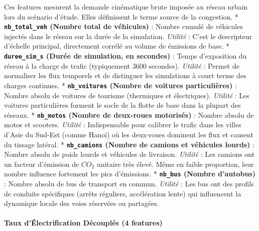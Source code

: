 \documentclass[10pt, a4paper]{article}
\begin{document}
Ces features mesurent la demande cinématique brute imposée au réseau
urbain lors du scénario d'étude. Elles définissent le terme source de la
congestion. * \textbf{\texttt{nb\_total\_veh} (Nombre total de
véhicules)} : Nombre cumulé de véhicules injectés dans le réseau sur la
durée de la simulation. \emph{Utilité} : C'est le descripteur d'échelle
principal, directement corrélé au volume de émissions de base. *
\textbf{\texttt{duree\_sim\_s} (Durée de simulation, en secondes)} :
Temps d'exposition du réseau à la charge de trafic (typiquement 3600
secondes). \emph{Utilité} : Permet de normaliser les flux temporels et
de distinguer les simulations à court terme des charges continues. *
\textbf{\texttt{nb\_voitures} (Nombre de voitures particulières)} :
Nombre absolu de voitures de tourisme (thermiques et électriques).
\emph{Utilité} : Les voitures particulières forment le socle de la
flotte de base dans la plupart des réseaux. * \textbf{\texttt{nb\_motos}
(Nombre de deux-roues motorisés)} : Nombre absolu de motos et scooters.
\emph{Utilité} : Indispensable pour calibrer le trafic dans les villes
d'Asie du Sud-Est (comme Hanoï) où les deux-roues dominent les flux et
causent du tissage latéral. * \textbf{\texttt{nb\_camions} (Nombre de
camions et véhicules lourds)} : Nombre absolu de poids lourds et
véhicules de livraison. \emph{Utilité} : Les camions ont un facteur
d'émission de \(CO_2\) unitaire très élevé. Même en faible proportion,
leur nombre influence fortement les pics d'émissions. *
\textbf{\texttt{nb\_bus} (Nombre d'autobus)} : Nombre absolu de bus de
transport en commun. \emph{Utilité} : Les bus ont des profils de
conduite spécifiques (arrêts réguliers, accélération lente) qui
influencent la dynamique locale des voies réservées ou partagées.

\paragraph{Taux d'Électrification Découplés (4
features)}\label{taux-duxe9lectrification-duxe9coupluxe9s-4-features}
\end{document}
